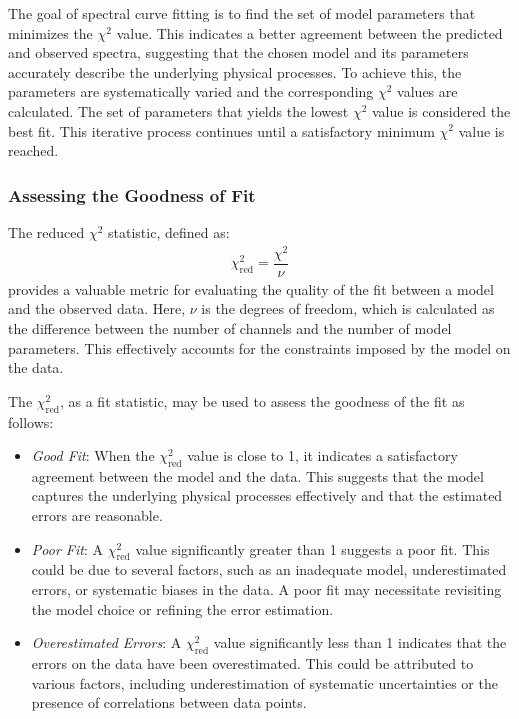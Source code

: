 				The goal of spectral curve fitting is to find the set of model parameters that minimizes the $\chi^2$ value. This indicates a better agreement between the predicted and observed spectra, suggesting that the chosen model and its parameters accurately describe the underlying physical processes. To achieve this, the parameters are systematically varied and the corresponding $\chi^2$ values are calculated. The set of parameters that yields the lowest $\chi^2$ value is considered the best fit. This iterative process continues until a satisfactory minimum $\chi^2$ value is reached.
			
			\subsubsection{Assessing the Goodness of Fit}
				The reduced $\chi^2$ statistic, defined as:
				\begin{align}
					\chi^2_\text{red}=\dfrac{\chi^2}{\nu} \label{eqn:chisq-reduced}
				\end{align}
				provides a valuable metric for evaluating the quality of the fit between a model and the observed data. Here, $\nu$ is the degrees of freedom, which is calculated as the difference between the number of channels and the number of model parameters. This effectively accounts for the constraints imposed by the model on the data.
				
				The $\chi^2_\text{red}$, as a fit statistic, may be used to assess the goodness of the fit as follows:
				\begin{itemize}
					\item \textit{Good Fit}: When the $\chi^2_\text{red}$ value is close to 1, it indicates a satisfactory agreement between the model and the data. This suggests that the model captures the underlying physical processes effectively and that the estimated errors are reasonable.
					\item \textit{Poor Fit}: A $\chi^2_\text{red}$ value significantly greater than 1 suggests a poor fit. This could be due to several factors, such as an inadequate model, underestimated errors, or systematic biases in the data. A poor fit may necessitate revisiting the model choice or refining the error estimation.
					\item \textit{Overestimated Errors}: A $\chi^2_\text{red}$ value significantly less than 1 indicates that the errors on the data have been overestimated. This could be attributed to various factors, including underestimation of systematic uncertainties or the presence of correlations between data points.
				\end{itemize}
				
